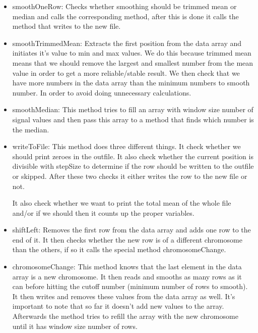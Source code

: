 \begin{itemize}
\item smoothOneRow: Checks whether smoothing should be trimmed mean or median and calls the corresponding method, after this is done it calls the method that writes to the new file.

\item smoothTrimmedMean: Extracts the first position from the data array and initiates it's value to min and max values. We do this because trimmed mean means that we should remove the largest and smallest number from the mean value in order to get a more reliable/stable result. We then check that we have more numbers in the data array than the minimum numbers to smooth number. In order to avoid doing unnecessary calculations. 

\item smoothMedian: This method tries to fill an array with window size number of signal values and then pass this array to a method that finds which number is the median.

\item writeToFile: This method does three different things. It check whether we should print zeroes in the outfile. It also check whether the current position is divisible with stepSize to determine if the row should be written to the outfile or skipped.  After these two checks it either writes the row to the new file or not.

It also check whether we want to print the total mean of the whole file and/or if we should then it counts up the proper variables.

\item shiftLeft: Removes the first row from the data array and adds one row to the end of it.  It then checks whether the new row is of a different chromosome than the others, if so it calls the special method chromosomeChange.

\item chromosomeChange: This method knows that the last element in the data array is a new chromosome. It then reads and smooths as many rows as it can before hitting the cutoff number (minimum number of rows to smooth). It then writes and removes these values from the data array as well. It's important to note that so far it doesn't add new values to the array. Afterwards the method tries to refill the array with the new chromosome until it has window size number of rows.



\end{itemize}



 
